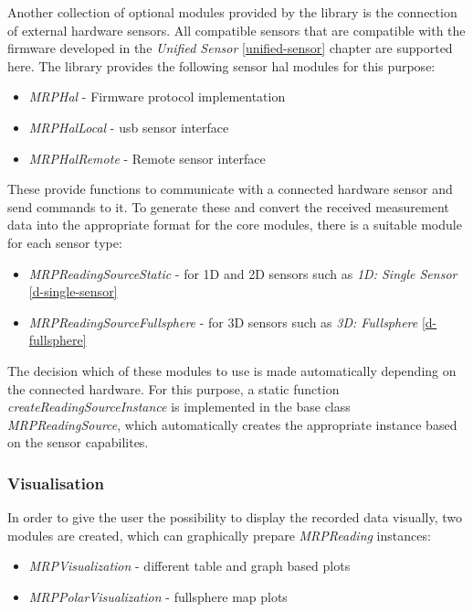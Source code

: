 Another collection of optional modules provided by the library is the
connection of external hardware sensors. All compatible sensors that are
compatible with the firmware developed in the \emph{Unified Sensor}
\ref{unified-sensor} chapter are supported here. The library provides
the following sensor \gls{hal} modules for this purpose:

\begin{itemize}
\tightlist
\item
  \emph{MRPHal} - Firmware protocol implementation
\item
  \emph{MRPHalLocal} - \gls{usb} sensor interface
\item
  \emph{MRPHalRemote} - Remote sensor interface
\end{itemize}

These provide functions to communicate with a connected hardware sensor
and send commands to it. To generate these and convert the received
measurement data into the appropriate format for the core modules, there
is a suitable module for each sensor type:

\begin{itemize}
\tightlist
\item
  \emph{MRPReadingSourceStatic} - for 1D and 2D sensors such as
  \emph{1D: Single Sensor} \ref{d-single-sensor}
\item
  \emph{MRPReadingSourceFullsphere} - for 3D sensors such as \emph{3D:
  Fullsphere} \ref{d-fullsphere}
\end{itemize}

The decision which of these modules to use is made automatically
depending on the connected hardware. For this purpose, a static function
\emph{createReadingSourceInstance} is implemented in the base class
\emph{MRPReadingSource}, which automatically creates the appropriate
instance based on the sensor capabilites.

\hypertarget{visualisation}{%
\subsubsection{Visualisation}\label{visualisation}}

In order to give the user the possibility to display the recorded data
visually, two modules are created, which can graphically prepare
\emph{MRPReading} instances:

\begin{itemize}
\tightlist
\item
  \emph{MRPVisualization} - different table and graph based plots
\item
  \emph{MRPPolarVisualization} - fullsphere map plots
\end{itemize}

